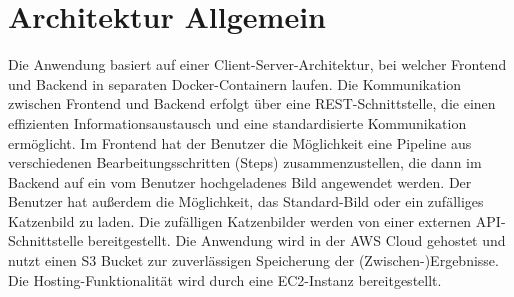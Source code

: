 \section{Architektur Allgemein}
Die Anwendung basiert auf einer Client-Server-Architektur, bei welcher Frontend und Backend in separaten Docker-Containern laufen. Die Kommunikation zwischen Frontend und Backend erfolgt über eine REST-Schnittstelle, die einen effizienten Informationsaustausch und eine standardisierte Kommunikation ermöglicht. Im Frontend hat der Benutzer die Möglichkeit eine Pipeline aus verschiedenen Bearbeitungsschritten (Steps) zusammenzustellen, die dann im Backend auf ein vom Benutzer hochgeladenes Bild angewendet werden. Der Benutzer hat außerdem die Möglichkeit, das Standard-Bild oder ein zufälliges Katzenbild zu laden. Die zufälligen Katzenbilder werden von einer externen API-Schnittstelle bereitgestellt. Die Anwendung wird in der AWS Cloud gehostet und nutzt einen S3 Bucket zur zuverlässigen Speicherung der (Zwischen-)Ergebnisse. Die Hosting-Funktionalität wird durch eine EC2-Instanz bereitgestellt.